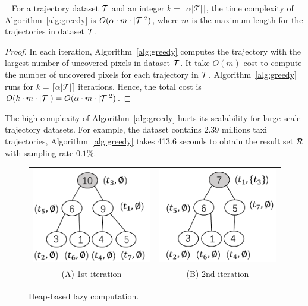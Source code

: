 \begin{lemma}~\label{lem:cost}
For a trajectory dataset $\mathcal{T}$ and an integer $k=\lceil \alpha |\mathcal{T}| \rceil$, the time complexity of Algorithm~\ref{alg:greedy} is $O(\alpha \cdot m \cdot |\mathcal{T}|^2)$,
where $m$ is the maximum length for the trajectories in dataset $\mathcal{T}$.
\end{lemma}


\begin{proof}
In each iteration, Algorithm~\ref{alg:greedy} computes the trajectory with the largest number of uncovered pixels in dataset $\mathcal{T}$.
It take $O(m)$ cost to compute the number of uncovered pixels for each trajectory in $\mathcal{T}$.
Algorithm~\ref{alg:greedy} runs for $k=\lceil \alpha |\mathcal{T}| \rceil$ iterations.
Hence, the total cost is $O(k \cdot m \cdot |\mathcal{T}|)=O(\alpha \cdot m \cdot |\mathcal{T}|^2)$.
\end{proof}

The high complexity of Algorithm~\ref{alg:greedy} hurts its scalability for large-scale trajectory datasets.
For example, the \pt{} dataset contains 2.39 millions taxi trajectories, Algorithm~\ref{alg:greedy} takes 413.6 seconds to obtain the result set $\mathcal{R}$ with sampling rate $0.1\%$.


\begin{figure}
	\centering
	\small
	\begin{tabular}{cc}
		\includegraphics[width=0.35\columnwidth]{pictures/1st}
		&
		\includegraphics[width=0.35\columnwidth]{pictures/2nd}
		\\
		(A) 1st iteration
		&
		(B) 2nd iteration
	\end{tabular}
    \trim
	\caption{Heap-based lazy computation.} \label{fig:heap} %
    \trim \trim
\end{figure}


